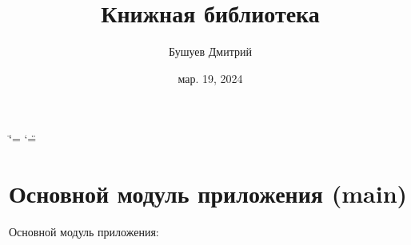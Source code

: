\documentclass[letterpaper,10pt,russian]{sphinxmanual}
\title{Книжная библиотека}
\date{мар. 19, 2024}
\author{Бушуев Дмитрий}
\begin{document}
\ifdefined\shorthandoff
  \ifnum\catcode`\=\string=\active\shorthandoff{=}\fi
  \ifnum\catcode`\"=\active{}\fi
\fi

\pagestyle{empty}
\sphinxmaketitle
\pagestyle{plain}
\sphinxtableofcontents
\pagestyle{normal}
\label{\detokenize{index::doc}}


\sphinxstepscope


\chapter{Основной модуль приложения (main)}
\label{\detokenize{main:main}}\label{\detokenize{main::doc}}
\sphinxAtStartPar
Основной модуль приложения:

\begin{sphinxVerbatim}[commandchars=\\\{\}]
  
 
   


\end{sphinxVerbatim}
\end{document}
